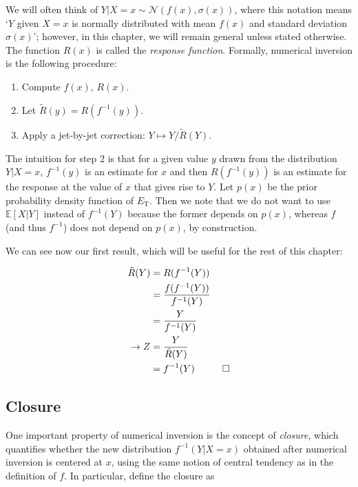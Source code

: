 We will often think of $Y|X=x\sim \mathcal{N}(f(x),\sigma(x))$, where this notation means `$Y$ given $X=x$ is normally distributed with mean $f(x)$ and standard deviation $\sigma(x)$'; however, in this chapter, we will remain general unless stated otherwise.  The function $R(x)$ is called the {\it response function}.  Formally, numerical inversion is the following procedure:

\begin{enumerate}
\item Compute $f(x)$, $R(x)$.  
\item Let $\tilde{R}(y) = R(f^{-1}(y))$.
\item Apply a jet-by-jet correction: $Y\mapsto Y/\tilde{R}(Y)$.
\end{enumerate}

The intuition for step 2 is that for a given value $y$ drawn from the distribution $Y|X=x$, $f^{-1}(y)$ is an estimate for $x$ and then $R(f^{-1}(y))$ is an estimate for the response at the value of $x$ that gives rise to $Y$. Let $p(x)$ be the prior probability density function of $E_\text{T}$. Then we note that we do not want to use $\mathbb{E}[X|Y]$ instead of $f^{-1}(Y)$ because the former depends on $p(x)$, whereas $f$ (and thus $f^{-1}$) does not depend on $p(x)$, by construction.  

\newpage
We can see now our first result, which will be useful for the rest of this chapter:
\vspace{6mm}


\begin{align}
\tilde{R}(Y) &= R(f^{-1}(Y))\nonumber\\
&= \frac{f(f^{-1}(Y))}{f^{-1}(Y)}\nonumber\\
&= \frac{Y}{f^{-1}(Y)}\nonumber\\
\rightarrow Z &= \frac{Y}{\tilde{R}(Y)}\nonumber\\
&= f^{-1}(Y) \hspace{1 cm} \Box
\end{align}

\subsection{Closure}
\label{sec:introclosure}
One important property of numerical inversion is the concept of {\it closure}, which quantifies whether the new distribution $f^{-1}(Y|X=x)$ obtained after numerical inversion is centered at $x$, using the same notion of central tendency as in the definition of $f$.  In particular, define the closure as

